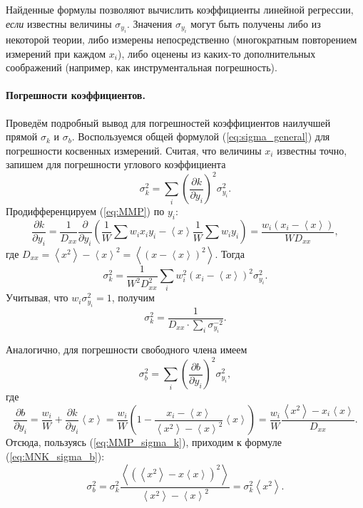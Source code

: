 \documentclass[10pt]{article}
\begin{document}
Найденные формулы позволяют вычислить коэффициенты линейной
регрессии, \emph{если} известны величины $\sigma_{y_{i}}$.
Значения $\sigma_{y_{i}}$ могут быть получены либо из некоторой теории,
либо измерены непосредственно (многократным повторением измерений
при каждом $x_{i}$), либо оценены из каких-то дополнительных соображений
(например, как инструментальная погрешность).

\paragraph{Погрешности коэффициентов.}

Проведём подробный вывод для погрешностей коэффициентов наилучшей
прямой $\sigma_{k}$ и $\sigma_{b}$. Воспользуемся общей формулой
(\ref{eq:sigma_general}) для погрешности косвенных измерений. Считая,
что величины $x_{i}$ известны точно, запишем для погрешности углового
коэффициента
\[
\sigma_{k}^{2}=\sum\limits _{i}\left(\frac{\partial k}{\partial y_{i}}\right)^{2}\sigma_{y_{i}}^{2}.
\]
Продифференцируем (\ref{eq:MMP}) по $y_{i}$:
\[
\frac{\partial k}{\partial y_{i}}=\frac{1}{D_{xx}}\frac{\partial}{\partial y_{i}}\left(\frac{1}{W}\sum w_{i}x_{i}y_{i}-\left\langle x\right\rangle \frac{1}{W}\sum w_{i}y_{i}\right)=\frac{w_{i}\left(x_{i}-\left\langle x\right\rangle \right)}{WD_{xx}},
\]
где $D_{xx}=\left\langle x^{2}\right\rangle -\left\langle x\right\rangle ^{2}=\left\langle (x-\left\langle x\right\rangle )^{2}\right\rangle $.
Тогда
\[
\sigma_{k}^{2}=\frac{1}{W^{2}D_{xx}^{2}}\sum\limits _{i}w_{i}^{2}\left(x_{i}-\left\langle x\right\rangle \right)^{2}\sigma_{y_{i}}^{2}.
\]
Учитывая, что $w_{i}\sigma_{y_{i}}^{2}=1$, получим
\begin{equation}
\boxed{\sigma_{k}^{2}=\frac{1}{D_{xx}\cdot\sum\limits _{i}\sigma_{y_{i}}^{-2}}}.\label{eq:MMP_sigma_k}
\end{equation}

Аналогично, для погрешности свободного члена имеем
\[
\sigma_{b}^{2}=\sum_{i}\left(\frac{\partial b}{\partial y_{i}}\right)^{2}\sigma_{y_{i}}^{2},
\]
где 
\[
\frac{\partial b}{\partial y_{i}}=\frac{w_{i}}{W}+\frac{\partial k}{\partial y_{i}}\left\langle x\right\rangle =\frac{w_{i}}{W}\left(1-\frac{x_{i}-\left\langle x\right\rangle }{\left\langle x^{2}\right\rangle -\left\langle x\right\rangle ^{2}}\left\langle x\right\rangle \right)=\frac{w_{i}}{W}\frac{\left\langle x^{2}\right\rangle -x_{i}\left\langle x\right\rangle }{D_{xx}}.
\]
Отсюда, пользуясь (\ref{eq:MMP_sigma_k}), приходим к формуле (\ref{eq:MNK_sigma_b}):
\[
\sigma_{b}^{2}=\sigma_{k}^{2}\frac{\left\langle \left(\left\langle x^{2}\right\rangle -x\left\langle x\right\rangle \right)^{2}\right\rangle }{\left\langle x^{2}\right\rangle -\left\langle x\right\rangle ^{2}}=\sigma_{k}^{2}\left\langle x^{2}\right\rangle .
\]
\end{document}
